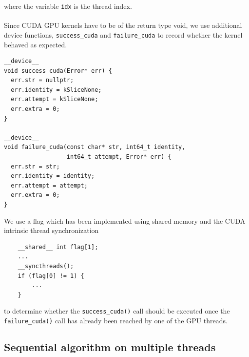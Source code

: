 \documentclass{article}
\begin{document}
where the variable \texttt{idx} is the thread index.\\
\\
Since CUDA GPU kernels have to be of the return type void, we use additional device functions, \texttt{success_cuda} and \texttt{failure_cuda} to record whether the kernel behaved as expected.\\
\begin{mdframed}[backgroundcolor=light-gray, roundcorner=10pt,leftmargin=0.5, rightmargin=0.5, innertopmargin=5,innerbottommargin=5, outerlinewidth=1, linecolor=light-gray]
\begin{verbatim}
__device__
void success_cuda(Error* err) {
  err.str = nullptr;
  err.identity = kSliceNone;
  err.attempt = kSliceNone;
  err.extra = 0;
}

__device__
void failure_cuda(const char* str, int64_t identity, 
                  int64_t attempt, Error* err) {
  err.str = str;
  err.identity = identity;
  err.attempt = attempt;
  err.extra = 0;
}
\end{verbatim}
\end{mdframed}
We use a flag which has been implemented using shared memory and the CUDA intrinsic thread synchronization 
\begin{mdframed}[backgroundcolor=light-gray, roundcorner=10pt,leftmargin=0.5, rightmargin=0.5, innertopmargin=5,innerbottommargin=5, outerlinewidth=1, linecolor=light-gray]
\begin{verbatim}
    __shared__ int flag[1];
    ...
    __syncthreads();
    if (flag[0] != 1) {
        ...
    }
\end{verbatim}
\end{mdframed}
to determine whether the \texttt{success_cuda()} call should be executed once the \texttt{failure_cuda()} call has already been reached by one of the GPU threads.

\subsection{Sequential algorithm on multiple threads}
\end{document}
